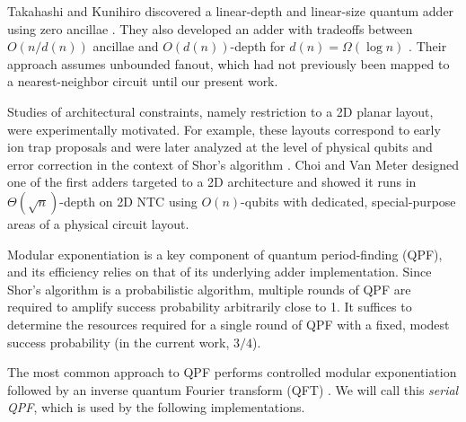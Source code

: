 Takahashi and Kunihiro discovered a linear-depth
and linear-size quantum adder using zero ancillae \cite{Takahashi2005}.
They also developed an adder with tradeoffs between $O(n/d(n))$ ancillae and
$O(d(n))$-depth for $d(n) = \Omega(\log n)$ \cite{Takahashi2009}. 
Their approach assumes unbounded fanout, which had not previously been mapped to a
nearest-neighbor circuit until our present work.

Studies of architectural constraints, namely restriction to a 2D planar layout, 
were experimentally motivated. For example, these layouts correspond
to early ion trap proposals \cite{Kielpinski2002}
and were later analyzed at the level of physical qubits and error correction in the context of Shor's algorithm \cite{Kubi09}.
Choi and Van Meter designed one of the first adders targeted to a 2D architecture 
and showed it runs in $\Theta(\sqrt{n})$-depth on \textsc{2D NTC} \cite{Choi2010}
using $O(n)$-qubits with dedicated, special-purpose areas of a physical
circuit layout.

Modular exponentiation is a key component of quantum period-finding (QPF),
and its efficiency relies on that of its underlying adder implementation.
Since Shor's algorithm is a probabilistic algorithm, multiple rounds of
QPF are required to amplify success probability arbitrarily close to 1.
It suffices to determine the resources
required for a single round of QPF with a fixed, modest success probability
(in the current work, $3/4$).

The most common approach to QPF performs controlled
modular exponentiation followed by an inverse quantum Fourier transform
(QFT) \cite{Nielsen2000}. We will call this \emph{serial QPF}, which is
used by the following implementations.

